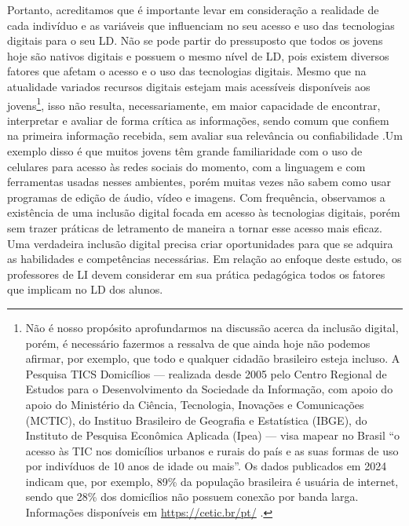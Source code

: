 Portanto, acreditamos que é importante levar em consideração a realidade
de cada indivíduo e as variáveis que influenciam no seu acesso e uso das
tecnologias digitais para o seu LD. Não se pode partir do pressuposto
que todos os jovens hoje são nativos digitais e possuem o mesmo nível de
LD, pois existem diversos fatores que afetam o acesso e o uso das
tecnologias digitais. Mesmo que na atualidade variados recursos digitais
estejam mais acessíveis disponíveis aos jovens\footnote{Não é nosso
  propósito aprofundarmos na discussão acerca da inclusão digital,
  porém, é necessário fazermos a ressalva de que ainda hoje não podemos
  afirmar, por exemplo, que todo e qualquer cidadão brasileiro esteja
  incluso. A Pesquisa TICS Domicílios --- realizada desde 2005 pelo
  Centro Regional de Estudos para o Desenvolvimento da Sociedade da
  Informação, com apoio do apoio do Ministério da Ciência, Tecnologia,
  Inovações e Comunicações (MCTIC), do Instituo Brasileiro de Geografia
  e Estatística (IBGE), do Instituto de Pesquisa Econômica Aplicada
  (Ipea) --- visa mapear no Brasil ``o acesso às TIC nos domicílios
  urbanos e rurais do país e as suas formas de uso por indivíduos de 10
  anos de idade ou mais''. Os dados publicados em 2024 indicam que, por
  exemplo, 89\% da população brasileira é usuária de internet, sendo que
  28\% dos domicílios não possuem conexão por banda larga. Informações
  disponíveis em \url{https://cetic.br/pt/} .}, isso não resulta,
necessariamente, em maior capacidade de encontrar, interpretar e avaliar
de forma crítica as informações, sendo comum que confiem na primeira
informação recebida, sem avaliar sua relevância ou confiabilidade
\cite{bueno2022reflexoes}.Um exemplo disso é que muitos jovens têm grande
familiaridade com o uso de celulares para acesso às redes sociais do
momento, com a linguagem e com ferramentas usadas nesses ambientes,
porém muitas vezes não sabem como usar programas de edição de áudio,
vídeo e imagens. Com frequência, observamos a existência de uma inclusão
digital focada em acesso às tecnologias digitais, porém sem trazer
práticas de letramento de maneira a tornar esse acesso mais eficaz. Uma
verdadeira inclusão digital precisa criar oportunidades para que se
adquira as habilidades e competências necessárias. Em relação ao enfoque
deste estudo, os professores de LI devem considerar em sua prática
pedagógica todos os fatores que implicam no LD dos alunos.

